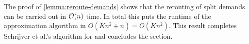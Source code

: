 The proof of \cref{lemma:reroute-demands} shows that the rerouting of split demands can be carried out in $\mathcal{O}(n)$ time.
In total this puts the runtime of the approximation algorithm in $O(K n^2 + n) = O(K n^2)$. 
This result completes Schrijver et al.'s algorithm for \RL and concludes the section.
